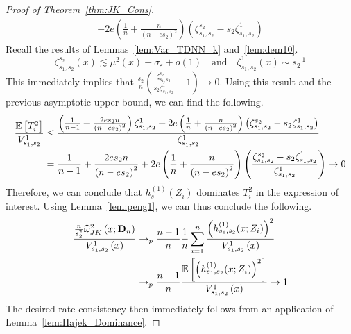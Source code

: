 \begin{proof}[Proof of Theorem~\ref{thm:JK_Cons}]
\begin{equation}
\begin{aligned}
			+ 2e\left(\frac{1}{n} + \frac{n}{\left(n - e s_2\right)^2}\right) \left(\zeta_{s_1, s_2}^{s_2} - s_2 \zeta_{s_1, s_2}^{1}\right)
		\end{aligned}
	\end{equation}
	Recall the results of Lemmas~\ref{lem:Var_TDNN_k} and~\ref{lem:dem10}.
	\begin{equation}
		\zeta_{s_1, s_2}^{s_2}\left(x\right) \lesssim \mu^2(x) + \sigma_{\varepsilon} + o(1)
		\quad \text{and} \quad
		\zeta_{s_1, s_2}^{1}\left(x\right) \sim s_2^{-1}
	\end{equation}
	This immediately implies that $\frac{s_2}{n}\left(\frac{\zeta_{s_1, s_2}^{s_2}}{s_2 \zeta_{s_1, s_2}^{1}} - 1\right) \rightarrow 0$.
	Using this result and the previous asymptotic upper bound, we can find the following.
	\begin{equation}
		\begin{aligned}
			\frac{\mathbb{E}\left[T_{i}^{2}\right]}{V_{s_1, s_2}^{1}}
			 & \leq \frac{\left(\frac{1}{n-1} + \frac{2 e s_2 n}{\left(n - e s_2\right)^2}\right) \zeta_{s_1, s_2}^{1}
			+ 2e\left(\frac{1}{n} + \frac{n}{\left(n - e s_2\right)^2}\right) \left(\zeta_{s_1, s_2}^{s_2} - s_2 \zeta_{s_1, s_2}^{1}\right)}{\zeta_{s_1, s_2}^{1}} \\
			 & = \frac{1}{n-1} + \frac{2 e s_2 n}{\left(n - e s_2\right)^2}
			+ 2e\left(\frac{1}{n} + \frac{n}{\left(n - e s_2\right)^2}\right) \left(\frac{\zeta_{s_1, s_2}^{s_2} - s_2 \zeta_{s_1, s_2}^{1}}{\zeta_{s_1, s_2}^{1}}\right)
			\rightarrow 0
		\end{aligned}
	\end{equation}
	Therefore, we can conclude that $h_{s}^{(1)}\left(Z_{i}\right)$ dominates $T_i^2$ in the expression of interest.
	Using Lemma~\ref{lem:peng1}, we can thus conclude the following.
	\begin{equation}
		\begin{aligned}
			\frac{\frac{n}{s_2^2}\widehat{\omega}^{2}_{JK}\left(x; \mathbf{D}_n\right)}{V_{s_1, s_2}^{1}\left(x\right)}
			 & \rightarrow_{p} \frac{n - 1}{n}\frac{1}{n}\sum_{i = 1}^{n}\frac{\left(h^{(1)}_{s_1, s_2}(x; Z_{i})\right)^{2}}{V_{s_1, s_2}^{1}\left(x\right)} \\\
			 & \rightarrow_{p} \frac{n - 1}{n}\frac{\mathbb{E}\left[\left(h^{(1)}_{s_1, s_2}(x; Z_{i})\right)^{2}\right]}{V_{s_1, s_2}^{1}\left(x\right)}
			\rightarrow 1
		\end{aligned}
	\end{equation}
	The desired rate-consistency then immediately follows from an application of Lemma~\ref{lem:Hajek_Dominance}.
\end{proof}

